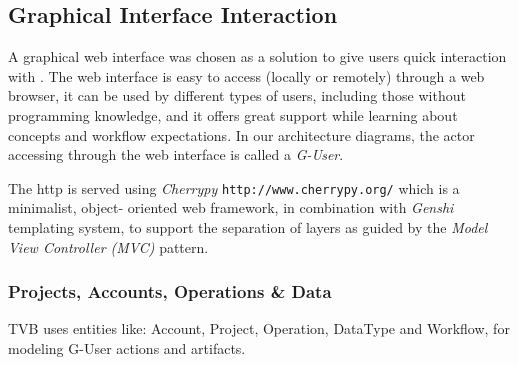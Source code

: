 \subsection{Graphical Interface Interaction}

		A graphical web interface was chosen as a solution to give users quick
		interaction with \TVB . The web interface is easy to access (locally or
		remotely) through a web browser, it can be used by different types of
		users, including those without programming knowledge, and it offers
		great support while learning about \TVB concepts and workflow
		expectations.  In our architecture diagrams, the actor accessing \TVB
		through the web interface is called a \emph{G-User}.

		The http is served using \emph{Cherrypy}
		\texttt{http://www.cherrypy.org/} which is a minimalist, object-
		oriented web framework,  in combination with \emph{Genshi} templating
		system, to support the separation of layers as guided by the 
		\emph{Model View Controller (MVC)} pattern.

		\subsubsection{Projects, Accounts, Operations \& Data}

		TVB uses entities like: Account, Project, Operation, DataType and
		Workflow, for modeling G-User actions and artifacts.

